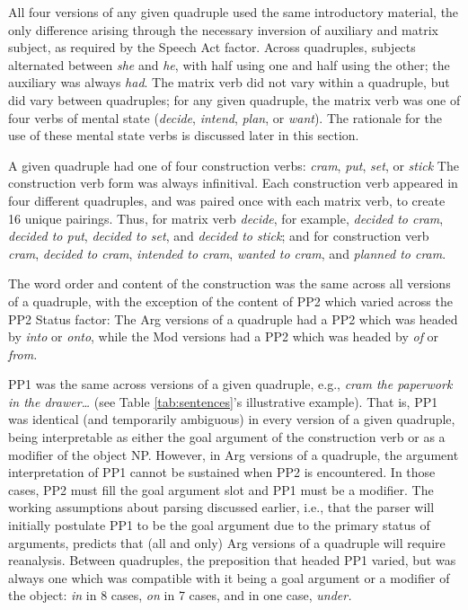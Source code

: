 \documentclass[11pt,oneside]{book}
\begin{document}
\doublespacing

All four versions of any given quadruple used the same introductory material, the only difference arising through the necessary inversion of auxiliary and matrix subject, as required by the Speech Act factor. Across quadruples, subjects alternated between \emph{she} and \emph{he}, with half using one and half using the other; the auxiliary was always \emph{had}. The matrix verb did not vary within a quadruple, but did vary between quadruples; for any given quadruple, the matrix verb was one of four verbs of mental state (\emph{decide}, \emph{intend}, \emph{plan}, or \emph{want}). The rationale for the use of these mental state verbs is discussed later in this section.

A given quadruple had one of four construction verbs: \emph{cram}, \emph{put}, \emph{set}, or \emph{stick} The construction verb form was always infinitival. Each construction verb appeared in four different quadruples, and was paired once with each matrix verb, to create 16 unique pairings. Thus, for matrix verb \emph{decide}, for example, \emph{decided to cram}, \emph{decided to put}, \emph{decided to set}, and \emph{decided to stick}; and for construction verb \emph{cram}, \emph{decided to cram}, \emph{intended to cram}, \emph{wanted to cram}, and \emph{planned to cram}.

The word order and content of the construction was the same across all versions of a quadruple, with the exception of the content of PP2 which varied across the PP2 Status factor: The Arg versions of a quadruple had a PP2 which was headed by \emph{into} or \emph{onto}, while the Mod versions had a PP2 which was headed by \emph{of} or \emph{from.}

PP1 was the same across versions of a given quadruple, e.g., \emph{cram the paperwork in the drawer\ldots{}} (see Table \ref{tab:sentences}'s illustrative example). That is, PP1 was identical (and temporarily ambiguous) in every version of a given quadruple, being interpretable as either the goal argument of the construction verb or as a modifier of the object NP. However, in Arg versions of a quadruple, the argument interpretation of PP1 cannot be sustained when PP2 is encountered. In those cases, PP2 must fill the goal argument slot and PP1 must be a modifier. The working assumptions about parsing discussed earlier, i.e., that the parser will initially postulate PP1 to be the goal argument due to the primary status of arguments, predicts that (all and only) Arg versions of a quadruple will require reanalysis. Between quadruples, the preposition that headed PP1 varied, but was always one which was compatible with it being a goal argument or a modifier of the object: \emph{in} in 8 cases, \emph{on} in 7 cases, and in one case, \emph{under.}
\end{document}
